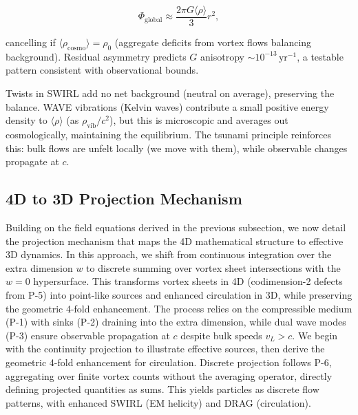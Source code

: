 \begin{equation}
\Phi_{\text{global}} \approx \frac{2\pi G \langle \rho \rangle}{3} r^2,
\end{equation}

cancelling if $\langle \rho_{\text{cosmo}} \rangle = \rho_0$ (aggregate deficits from vortex flows balancing background). Residual asymmetry predicts $G$ anisotropy $\sim 10^{-13} \,\mathrm{yr}^{-1}$, a testable pattern consistent with observational bounds.

Twists in SWIRL add no net background (neutral on average), preserving the balance. WAVE vibrations (Kelvin waves) contribute a small positive energy density to $\langle \rho \rangle$ (as $\rho_{\text{vib}} / c^2$), but this is microscopic and averages out cosmologically, maintaining the equilibrium. The tsunami principle reinforces this: bulk flows are unfelt locally (we move with them), while observable changes propagate at $c$.

\medskip
{}
\medskip

\subsection{4D to 3D Projection Mechanism}

Building on the field equations derived in the previous subsection, we now detail the projection mechanism that maps the 4D mathematical structure to effective 3D dynamics. In this approach, we shift from continuous integration over the extra dimension $w$ to discrete summing over vortex sheet intersections with the $w=0$ hypersurface. This transforms vortex sheets in 4D (codimension-2 defects from P-5) into point-like sources and enhanced circulation in 3D, while preserving the geometric 4-fold enhancement. The process relies on the compressible medium (P-1) with sinks (P-2) draining into the extra dimension, while dual wave modes (P-3) ensure observable propagation at $c$ despite bulk speeds $v_L > c$. We begin with the continuity projection to illustrate effective sources, then derive the geometric 4-fold enhancement for circulation. Discrete projection follows P-6, aggregating over finite vortex counts without the averaging operator, directly defining projected quantities as sums. This yields particles as discrete flow patterns, with enhanced SWIRL (EM helicity) and DRAG (circulation).

